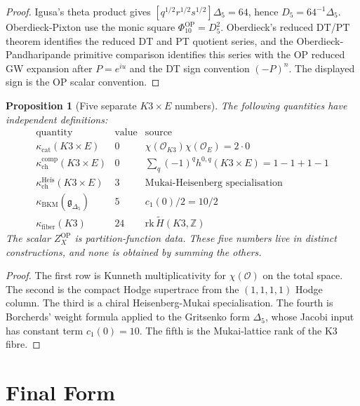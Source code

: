 \documentclass[11pt]{article}
\newtheorem{proposition}[theorem]{Proposition}
\theoremstyle{definition}
\providecommand{\Z}{\mathbb{Z}}
\providecommand{\cO}{\mathcal{O}}
\providecommand{\fg}{\mathfrak{g}}
\providecommand{\kcat}{\kappa_{\mathrm{cat}}}
\providecommand{\kchcomp}{\kappa_{\mathrm{ch}}^{\mathrm{comp}}}
\providecommand{\kchHeis}{\kappa_{\mathrm{ch}}^{\mathrm{Heis}}}
\providecommand{\kBKM}{\kappa_{\mathrm{BKM}}}
\providecommand{\kfib}{\kappa_{\mathrm{fiber}}}
\providecommand{\DeltaFive}{\Delta_5}
\providecommand{\PhiTen}{\Phi_{10}}
\providecommand{\Dfive}{D_5}
\begin{document}
\begin{proof}
Igusa's theta product gives
\([q^{1/2}r^{1/2}s^{1/2}]\DeltaFive=64\), hence
\(\Dfive=64^{-1}\DeltaFive\).  Oberdieck-Pixton use the monic square
\(\PhiTen^{\mathrm{OP}}=\Dfive^2\).  Oberdieck's reduced DT/PT theorem
identifies the reduced DT and PT quotient series, and the
Oberdieck-Pandharipande primitive comparison identifies this series with
the OP reduced GW expansion after \(P=e^{iu}\) and the DT sign convention
\((-P)^n\).  The displayed sign is the OP scalar convention.
\end{proof}

\begin{proposition}[Five separate \(K3\times E\) numbers]
\label{prop:k3e-five-numbers}
The following quantities have independent definitions:
\[
\begin{array}{c|c|c}
\text{quantity} & \text{value} & \text{source}\\
\hline
\kcat(K3\times E) & 0
& \chi(\cO_{K3})\chi(\cO_E)=2\cdot0\\
\kchcomp(K3\times E) & 0
& \sum_q(-1)^qh^{0,q}(K3\times E)=1-1+1-1\\
\kchHeis(K3\times E) & 3
& \text{Mukai-Heisenberg specialisation}\\
\kBKM(\fg_{\DeltaFive}) & 5
& c_1(0)/2=10/2\\
\kfib(K3) & 24
& \mathrm{rk}\,\widetilde H(K3,\Z)
\end{array}
\]
The scalar \(Z_X^{\mathrm{OP}}\) is partition-function data.  These five
numbers live in distinct constructions, and none is obtained by summing
the others.
\end{proposition}

\begin{proof}
The first row is Kunneth multiplicativity for \(\chi(\cO)\) on the total
space.  The second is the compact Hodge supertrace from the
\((1,1,1,1)\) Hodge column.  The third is a chiral Heisenberg-Mukai
specialisation.  The fourth is Borcherds' weight formula applied to the
Gritsenko form \(\DeltaFive\), whose Jacobi input has constant term
\(c_1(0)=10\).  The fifth is the Mukai-lattice rank of the K3 fibre.
\end{proof}

\section{Final Form}
\end{document}
